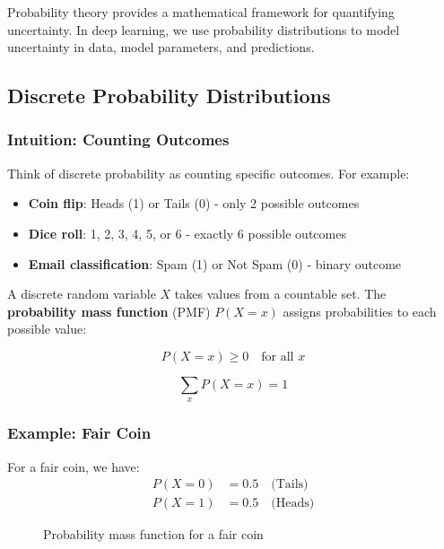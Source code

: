 Probability theory provides a mathematical framework for quantifying uncertainty. In deep learning, we use probability distributions to model uncertainty in data, model parameters, and predictions.

\subsection{Discrete Probability Distributions}

\subsubsection{Intuition: Counting Outcomes}

Think of discrete probability as counting specific outcomes. For example:
\begin{itemize}
    \item \textbf{Coin flip}: Heads (1) or Tails (0) - only 2 possible outcomes
    \item \textbf{Dice roll}: 1, 2, 3, 4, 5, or 6 - exactly 6 possible outcomes
    \item \textbf{Email classification}: Spam (1) or Not Spam (0) - binary outcome
\end{itemize}

A discrete random variable $X$ takes values from a countable set. The \textbf{probability mass function} (PMF) $P(X=x)$ assigns probabilities to each possible value:

\begin{equation}
P(X=x) \geq 0 \quad \text{for all } x
\end{equation}

\begin{equation}
\sum_{x} P(X=x) = 1
\end{equation}

\subsubsection{Example: Fair Coin}

For a fair coin, we have:
\begin{align}
P(X=0) &= 0.5 \quad \text{(Tails)} \\
P(X=1) &= 0.5 \quad \text{(Heads)}
\end{align}

\begin{figure}[h]
\centering
{}
\caption{Probability mass function for a fair coin}
\label{fig:coin-pmf}
\end{figure}

